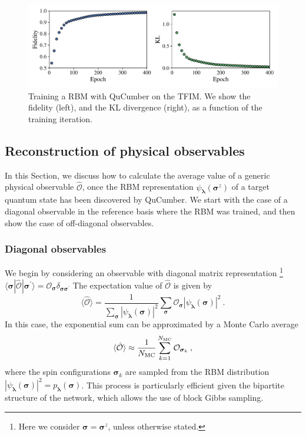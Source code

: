 \documentclass[submission, Phys, hidelinks]{SciPost}
\begin{document}
		\begin{figure}[hbt]
			\centering{}
			\includegraphics[width=\textwidth]{plots/fid_KL.pdf}
			\caption{\label{fig:KL} Training a RBM with QuCumber on the TFIM. We show the fidelity (left), and the KL divergence (right), as a function of the training iteration.}
		\end{figure}

	\subsection{Reconstruction of physical observables} \label{Sec:Sampling_a-Trained_RBM}
		In this Section, we discuss how to calculate the average value of a generic physical observable $\hat{\mathcal{O}}$, once the RBM representation $\psi_{\bm{\lambda}}(\bm{\sigma}^z)$ of a target quantum state has been discovered by QuCumber. We start with the case of a diagonal observable in the reference basis where the RBM was trained, and then show the case of off-diagonal observables.

		\subsubsection{Diagonal observables}
		We begin by considering an observable with diagonal matrix representation
        \footnote{
        Here we consider $\bm{\sigma}=\bm{\sigma}^z$, unless otherwise stated.
        } 
        $\langle\bm{\sigma}|\hat{\mathcal{O}}|\bm{\sigma}^{\prime}\rangle=\mathcal{O}_{\bm{\sigma}}\delta_{\bm{\sigma\sigma}^\prime}$
        The expectation value of $\hat{\mathcal{O}}$ is given by
		\begin{equation}
			\langle \hat{\mathcal{O}} \rangle = \frac{1}{\sum_{\bm{\sigma}} |\psi_{\bm{\lambda}}(\bm{\sigma})|^2}
			\sum_{\bm{\sigma}} \mathcal{O}_{\bm{\sigma}}|\psi_{\bm{\lambda}}(\bm{\sigma})|^2\:.
		\end{equation}
		In this case, the exponential sum can be approximated by a Monte Carlo average
		\begin{equation}
			\langle \hat{\mathcal{O}}\rangle \approx \frac{1}{N_{\rm MC}} \sum_{k=1}^{N_{\rm MC}} \mathcal{O}_{\bm{\sigma}_k}\:,
		\end{equation}
		where the spin configurations $\bm{\sigma}_k$ are sampled from the RBM distribution $|\psi_{\bm{\lambda}}(\bm{\sigma})|^2=p_{\bm{\lambda}}(\bm{\sigma})$. This process is particularly efficient given the bipartite structure of the network, which allows the use of block Gibbs sampling. 
\end{document}
